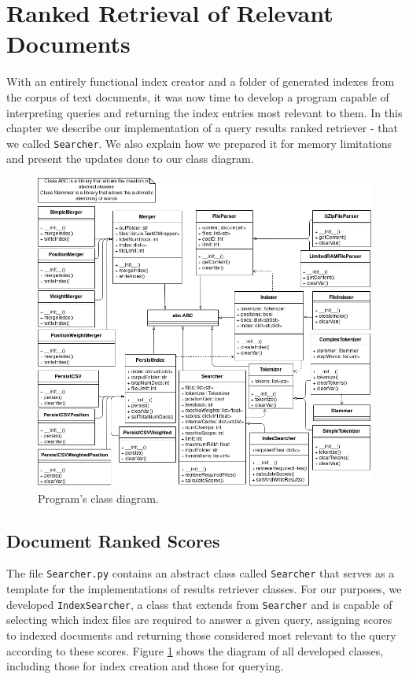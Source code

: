 \documentclass[12pt]{article}
\begin{document}
\newpage
\section{Ranked Retrieval of Relevant Documents}

With an entirely functional index creator and a folder of generated indexes from
the corpus of text documents, it was now time to develop a program capable of
interpreting queries and returning the index entries most relevant to them.
In this chapter we describe our implementation of a query results ranked retriever
- that we called \texttt{Searcher}.
We also explain how we prepared it for memory limitations and present the 
updates done to our class diagram.

\begin{figure}[h!]
\includegraphics[width=\linewidth]{ClassDiagram_assign3.png}
\caption{Program's class diagram.}
\label{fig:classdiagram}
\end{figure}

\newpage
\subsection{Document Ranked Scores}

The file \texttt{Searcher.py} contains an abstract class called \texttt{Searcher}
that serves as a template for the implementations of results retriever classes.
For our purposes, we developed \texttt{IndexSearcher}, a class that extends from
\texttt{Searcher} and is capable of selecting which index files are required to 
answer a given query, assigning scores to indexed documents and returning those 
considered most relevant to the query according to these scores.
Figure \ref{fig:classdiagram} shows the diagram of all developed classes, 
including those for index creation and those for querying.
\end{document}
